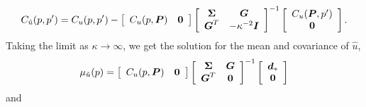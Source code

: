 \documentclass[extra,mreferee]{gji}
\begin{document}
\begin{equation}\label{eq:PosteriorCov2}
C_{\hat{u}}(p,p') = C_u(p,p') - 
                    \left[\begin{array}{cc}
                          C_u(p,\mitbf{P}) & \mitbf{0} \\
                          \end{array}\right]
                    \left[\begin{array}{cc}
                          \mitbf{\Sigma} & \mitbf{G} \\
                          \mitbf{G}^T  & -\kappa^{-2} \mitbf{I} \\
                          \end{array}\right]^{-1}
                    \left[\begin{array}{c}
                          C_u(\mitbf{P},p') \\
                          \mitbf{0} \\
                          \end{array}\right].
\end{equation}
Taking the limit as $\kappa \to \infty$, we get the solution for the mean and covariance of $\hat{u}$,
 \begin{equation}\label{eq:PosteriorMean3}
\mu_{\hat{u}}(p) = \left[\begin{array}{cc}
                         C_u(p,\mitbf{P}) & \mitbf{0} \\
                         \end{array}\right]
                   \left[\begin{array}{cc}
                         \mitbf{\Sigma} & \mitbf{G} \\
                         \mitbf{G}^T  & \mitbf{0} \\
                         \end{array}\right]^{-1}
                   \left[\begin{array}{c}
                         \mitbf{d}_* \\
                         \mitbf{0} \\
                         \end{array}\right]
\end{equation}    
and
\end{document}
